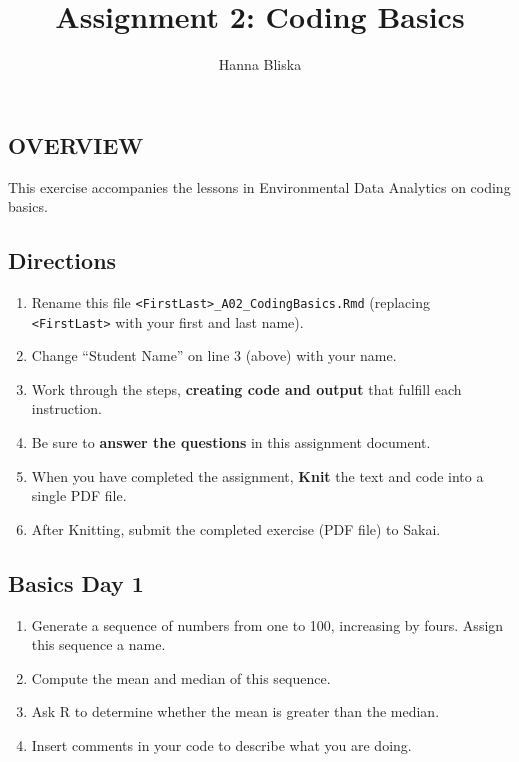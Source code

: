 \documentclass[
]{article}
\title{Assignment 2: Coding Basics}
\author{Hanna Bliska}
\date{}
\providecommand{\tightlist}{%
  \setlength{\itemsep}{0pt}\setlength{\parskip}{0pt}}
\begin{document}
\maketitle

\hypertarget{overview}{%
\subsection{OVERVIEW}\label{overview}}

This exercise accompanies the lessons in Environmental Data Analytics on
coding basics.

\hypertarget{directions}{%
\subsection{Directions}\label{directions}}

\begin{enumerate}
\def\labelenumi{\arabic{enumi}.}
\tightlist
\item
  Rename this file
  \texttt{\textless{}FirstLast\textgreater{}\_A02\_CodingBasics.Rmd}
  (replacing \texttt{\textless{}FirstLast\textgreater{}} with your first
  and last name).
\item
  Change ``Student Name'' on line 3 (above) with your name.
\item
  Work through the steps, \textbf{creating code and output} that fulfill
  each instruction.
\item
  Be sure to \textbf{answer the questions} in this assignment document.
\item
  When you have completed the assignment, \textbf{Knit} the text and
  code into a single PDF file.
\item
  After Knitting, submit the completed exercise (PDF file) to Sakai.
\end{enumerate}

\hypertarget{basics-day-1}{%
\subsection{Basics Day 1}\label{basics-day-1}}

\begin{enumerate}
\def\labelenumi{\arabic{enumi}.}
\item
  Generate a sequence of numbers from one to 100, increasing by fours.
  Assign this sequence a name.
\item
  Compute the mean and median of this sequence.
\item
  Ask R to determine whether the mean is greater than the median.
\item
  Insert comments in your code to describe what you are doing.
\end{enumerate}
\end{document}
